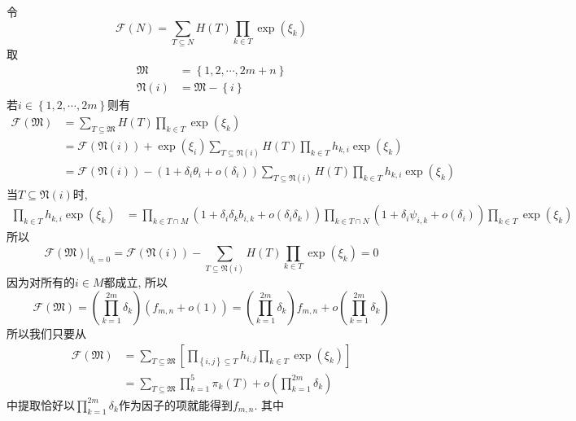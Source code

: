 \documentclass[12pt,a4paper,UTF8]{article}
\newcommand{\sbrace}[1]{\left(#1\right)}
\newcommand{\mbrace}[1]{\left[#1\right]}
\newcommand{\bbrace}[1]{\left\{#1\right\}}
\newcommand{\eval}[2]{\left.{#1}\right|_{#2}}
\newcommand{\FM}{\mathfrak{M}}
\newcommand{\FN}{\mathfrak{N}}
\newcommand{\CF}{\mathcal{F}}
\begin{document}
令
\begin{equation}
  \CF(N)=\sum_{T\subseteq N}{H(T)\prod_{k\in T}{\exp(\xi_k)}}
\end{equation}
取
\begin{equation}
\begin{aligned}
  \FM&=\bbrace{1,2,\cdots,2m+n} \\ 
  \FN(i)&=\FM - \bbrace{i}
\end{aligned}
\end{equation}
若$i\in \bbrace{1,2,\cdots,2m}$则有
\begin{equation}
\begin{aligned}
  \CF(\FM)&=\sum_{T\subseteq \FM}{H(T)\prod_{k\in T}{\exp(\xi_k)}} \\ 
  &=\CF(\FN(i))+\exp(\xi_i)\sum_{T\subseteq \FN(i)}{H(T)\prod_{k\in T}{h_{k,i}\exp(\xi_k)}} \\
  &=\CF(\FN(i))-(1+\delta_i \theta_i+o(\delta_i))\sum_{T\subseteq \FN(i)}{H(T)\prod_{k\in T}{h_{k,i}\exp(\xi_k)}}
\end{aligned}
\end{equation}
当$T\subseteq \FN(i)$时, 
\begin{equation}
\begin{aligned}
  \prod_{k\in T}{h_{k,i}\exp(\xi_k)}&=\prod_{k\in T \cap M}{\sbrace{1+\delta_i \delta_k b_{i,k}+o(\delta_i \delta_k)}}\prod_{k\in T \cap N}\sbrace{1+\delta_i \psi_{i,k}+o(\delta_i)}\prod_{k\in T}{\exp(\xi_k)}
\end{aligned}
\end{equation}
所以 
\begin{equation}
  \eval{\CF(\FM)}{\delta_i=0}=\CF(\FN(i))-\sum_{T\subseteq \FN(i)}{H(T)\prod_{k\in T}{\exp(\xi_k)}}=0
\end{equation}
因为对所有的$i\in M$都成立, 所以 
\begin{equation}
  \CF(\FM)=\sbrace{\prod_{k=1}^{2m}{\delta_k}}\sbrace{f_{m,n}+o(1)}=\sbrace{\prod_{k=1}^{2m}{\delta_k}}f_{m,n}+o\sbrace{\prod_{k=1}^{2m}{\delta_k}}
\end{equation}
所以我们只要从 
\begin{equation}
\begin{aligned}
\CF(\FM)&=\sum_{T\subseteq \FM}\mbrace{\prod_{\bbrace{i,j}\subseteq T}{h_{i,j}}\prod_{k\in T}{\exp(\xi_k)}} \\ 
&=\sum_{T\subseteq \FM}{\prod_{k=1}^5{\pi_k(T)}}+o\sbrace{\prod_{k=1}^{2m}{\delta_k}}
\end{aligned}
\end{equation}
中提取恰好以$\prod_{k=1}^{2m}{\delta_k}$作为因子的项就能得到$f_{m,n}$. 其中 
\end{document}
